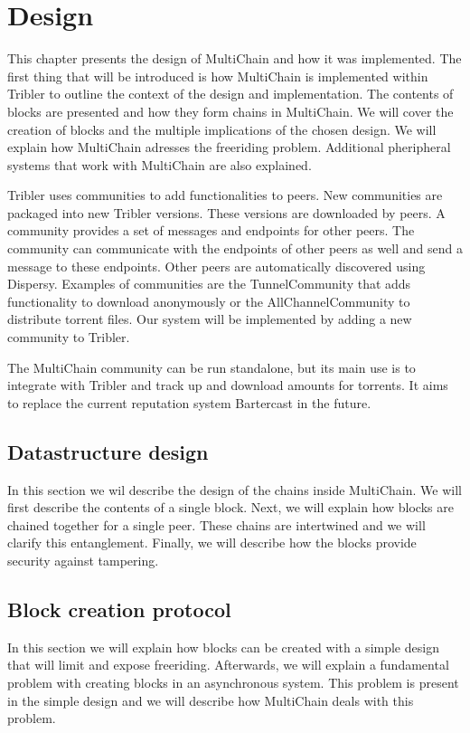 \chapter{Design}
\label{chapt:design}
This chapter presents the design of MultiChain and how it was implemented.
The first thing that will be introduced is how MultiChain is implemented within Tribler
to outline the context of the design and implementation.
The contents of blocks are presented and how they form chains in MultiChain.
We will cover the creation of blocks and the multiple implications of the chosen design.
We will explain how MultiChain adresses the freeriding problem.
Additional pheripheral systems that work with MultiChain are also explained.

Tribler uses communities to add functionalities to peers.
New communities are packaged into new Tribler versions.
These versions are downloaded by peers.
A community provides a set of messages and endpoints for other peers.
The community can communicate with the endpoints of other peers as well and send a message to these endpoints.
Other peers are automatically discovered using Dispersy.
Examples of communities are the TunnelCommunity that adds functionality to download anonymously\cite{Plak-anonymous}
or the AllChannelCommunity to distribute torrent files.
Our system will be implemented by adding a new community to Tribler.

The MultiChain community can be run standalone,
but its main use is to integrate with Tribler and track up and download amounts for torrents.
It aims to replace the current reputation system Bartercast in the future.

\section{Datastructure design}
In this section we wil describe the design of the chains inside MultiChain.
We will first describe the contents of a single block.
Next, we will explain how blocks are chained together for a single peer.
These chains are intertwined and we will clarify this entanglement.
Finally, we will describe how the blocks provide security against tampering.






\section{Block creation protocol}
\label{design:block_creation}
In this section we will explain how blocks can be created with a simple design
that will limit and expose freeriding.
Afterwards, we will explain a fundamental problem with creating blocks in an asynchronous system.
This problem is present in the simple design
and we will describe how MultiChain deals with this problem.

